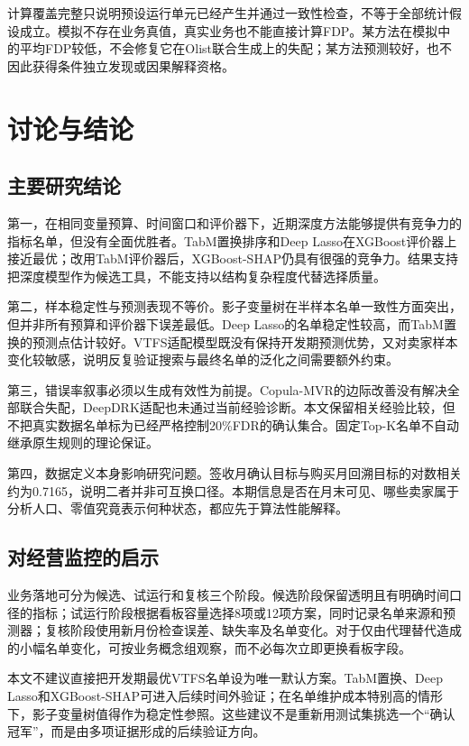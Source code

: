 \documentclass{sufethesismas}
\begin{document}
计算覆盖完整只说明预设运行单元已经产生并通过一致性检查，不等于全部统计假设成立。模拟不存在业务真值，真实业务也不能直接计算FDP。某方法在模拟中的平均FDP较低，不会修复它在Olist联合生成上的失配；某方法预测较好，也不因此获得条件独立发现或因果解释资格。

\chapter{讨论与结论}

\section{主要研究结论}

第一，在相同变量预算、时间窗口和评价器下，近期深度方法能够提供有竞争力的指标名单，但没有全面优胜者。TabM置换排序和Deep Lasso在XGBoost评价器上接近最优；改用TabM评价器后，XGBoost-SHAP仍具有很强的竞争力。结果支持把深度模型作为候选工具，不能支持以结构复杂程度代替选择质量。

第二，样本稳定性与预测表现不等价。影子变量树在半样本名单一致性方面突出，但并非所有预算和评价器下误差最低。Deep Lasso的名单稳定性较高，而TabM置换的预测点估计较好。VTFS适配模型既没有保持开发期预测优势，又对卖家样本变化较敏感，说明反复验证搜索与最终名单的泛化之间需要额外约束。

第三，错误率叙事必须以生成有效性为前提。Copula-MVR的边际改善没有解决全部联合失配，DeepDRK适配也未通过当前经验诊断。本文保留相关经验比较，但不把真实数据名单标为已经严格控制20\%FDR的确认集合。固定Top-K名单不自动继承原生规则的理论保证。

第四，数据定义本身影响研究问题。签收月确认目标与购买月回溯目标的对数相关约为0.7165，说明二者并非可互换口径。本期信息是否在月末可见、哪些卖家属于分析人口、零值究竟表示何种状态，都应先于算法性能解释。

\section{对经营监控的启示}

业务落地可分为候选、试运行和复核三个阶段。候选阶段保留透明且有明确时间口径的指标；试运行阶段根据看板容量选择8项或12项方案，同时记录名单来源和预测器；复核阶段使用新月份检查误差、缺失率及名单变化。对于仅由代理替代造成的小幅名单变化，可按业务概念组观察，而不必每次立即更换看板字段。

本文不建议直接把开发期最优VTFS名单设为唯一默认方案。TabM置换、Deep Lasso和XGBoost-SHAP可进入后续时间外验证；在名单维护成本特别高的情形下，影子变量树值得作为稳定性参照。这些建议不是重新用测试集挑选一个``确认冠军''，而是由多项证据形成的后续验证方向。
\end{document}
